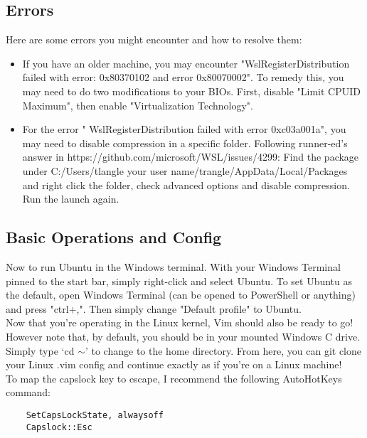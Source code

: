 \subsection{Errors}
Here are some errors you might encounter and how to resolve them:
\begin{itemize}
    \item If you have an older machine, you may encounter
        "WslRegisterDistribution failed with error: 0x80370102 and error 0x80070002". To
        remedy this, you may need to do two modifications to your BIOs. First, disable
        "Limit CPUID Maximum", then enable "Virtualization Technology".
    \item For the error " WslRegisterDistribution  failed with error
        0xc03a001a", you may need to disable compression in a specific folder.
        Following runner-ed's answer in
        https://github.com/microsoft/WSL/issues/4299: Find the package under
        C:/Users/tlangle your user name/trangle/AppData/Local/Packages and right click the
        folder, check advanced options and disable compression. Run the launch
        again.
\end{itemize}

\subsection{Basic Operations and Config}
Now to run Ubuntu in the Windows terminal. With your Windows Terminal pinned to
the start bar, simply right-click and select Ubuntu. To set Ubuntu as the
default, open Windows Terminal (can be opened to PowerShell or anything) and
press "ctrl+,". Then simply change "Default profile" to Ubuntu.\\

Now that you're operating in the Linux kernel, Vim should also be ready to go!
However note that, by default, you should be in your mounted Windows C drive.
Simply type `cd $\sim$' to change to the home directory. From here, you can git
clone your Linux .vim config and continue exactly as if you're on a Linux
machine!\\

To map the capslock key to escape, I recommend the following AutoHotKeys
command:
\begin{lstlisting}
    SetCapsLockState, alwaysoff
    Capslock::Esc
\end{lstlisting}

